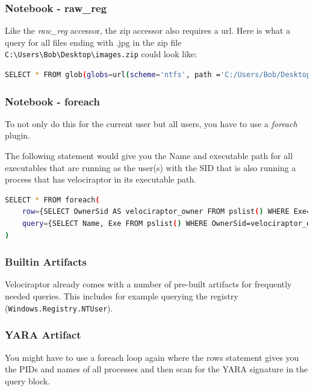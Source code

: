 \subsubsection{Notebook - raw\_reg}
Like the \textit{raw\_reg} accessor, the zip accessor also requires a url. Here is what a query for all files ending with .jpg in the zip file \lstinline|C:\Users\Bob\Desktop\images.zip| could look like:

\begin{lstlisting}[language=bash]
    SELECT * FROM glob(globs=url(scheme='ntfs', path ='C:/Users/Bob/Desktop/images.zip', fragment='/**/*.jpg').String, accessor='zip')
\end{lstlisting}

\subsubsection{Notebook - foreach}
To not only do this for the current user but all users, you have to use a \textit{foreach} plugin.

The following statement would give you the Name and executable path for all executables that are running as the user(s) with the SID that is also running a process that has velociraptor in its executable path.

\begin{lstlisting}[language=bash]
    SELECT * FROM foreach(
    row={SELECT OwnerSid AS velociraptor_owner FROM pslist() WHERE Exe=~'velociraptor'},
    query={SELECT Name, Exe FROM pslist() WHERE OwnerSid=velociraptor_owner}
)
\end{lstlisting}

\subsubsection{Builtin Artifacts}
Velociraptor already comes with a number of pre-built artifacts for frequently needed queries.
This includes for example querying the registry (\lstinline|Windows.Registry.NTUser|).

\subsubsection{YARA Artifact}
You might have to use a foreach loop again where the rows statement gives you the PIDs and names of all processes and then scan for the YARA signature in the query block.





